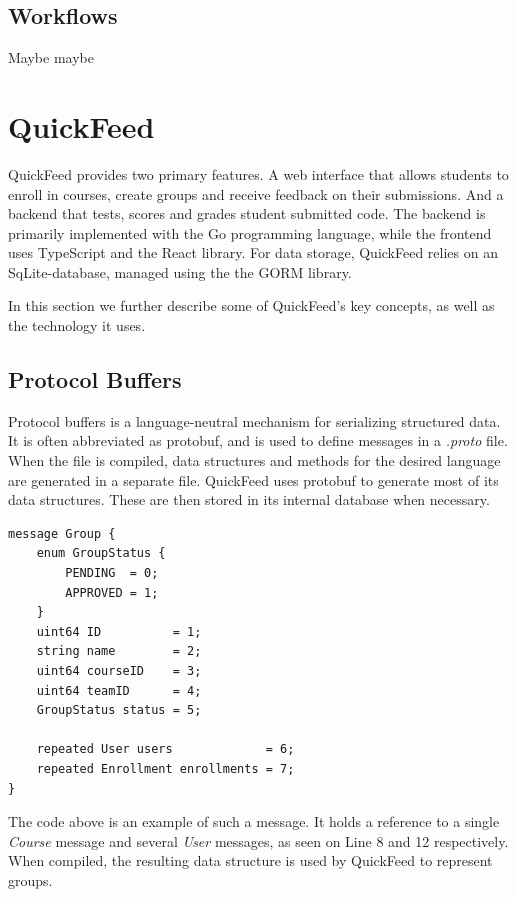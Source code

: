 \subsection{Workflows}

Maybe maybe

\section{QuickFeed}

QuickFeed provides two primary features.
A web interface that allows students to enroll in courses, create groups and receive feedback on their submissions.
And a backend that tests, scores and grades student submitted code.
The backend is primarily implemented with the Go programming language, while the frontend uses TypeScript and the React library.
For data storage, QuickFeed relies on an SqLite-database, managed using the the GORM library.

In this section we further describe some of QuickFeed's key concepts, as well as the technology it uses.

\subsection{Protocol Buffers}

Protocol buffers is a language-neutral mechanism for serializing structured data. %
It is often abbreviated as protobuf, and is used to define messages in a \textit{.proto} file.
When the file is compiled, data structures and methods for the desired language are generated in a separate file.
QuickFeed uses protobuf to generate most of its data structures.
These are then stored in its internal database when necessary.

\begin{lstlisting}[caption={Group message}]
message Group {
    enum GroupStatus {
        PENDING  = 0;
        APPROVED = 1;
    }
    uint64 ID          = 1;
    string name        = 2;
    uint64 courseID    = 3;
    uint64 teamID      = 4;
    GroupStatus status = 5;

    repeated User users             = 6;
    repeated Enrollment enrollments = 7;
}
\end{lstlisting}

The code above is an example of such a message.
It holds a reference to a single \textit{Course} message and several \textit{User} messages, as seen on Line 8 and 12 respectively.
When compiled, the resulting data structure is used by QuickFeed to represent groups.

